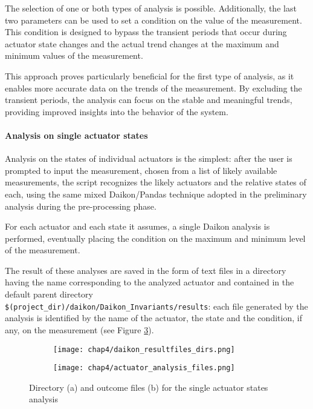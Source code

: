 The selection of one or both types of analysis is possible. Additionally, the last two parameters can be used to set a condition on the value of the measurement. This condition is designed to bypass the transient periods that occur during actuator state changes and the actual trend changes at the maximum and minimum values of the measurement.

This approach proves particularly beneficial for the first type of analysis, as it enables more accurate data on the trends of the measurement. By excluding the transient periods, the analysis can focus on the stable and meaningful trends, providing improved insights into the behavior of the system.

\paragraph{Analysis on single actuator states}
\label{par:4_single_actuator_states_analysis}
Analysis on the states of individual actuators is the simplest: after the user is prompted to input the measurement, chosen from a list of likely available measurements, the script recognizes the likely actuators and the relative states of each, using the same mixed Daikon/Pandas technique adopted in the preliminary analysis during the pre-processing phase.

For each actuator and each state it assumes, a single Daikon analysis is performed, eventually placing the condition on the maximum and minimum level of the measurement.
 
The result of these analyses are saved in the form of text files in a directory having the name corresponding to the analyzed actuator and contained in the default parent directory\\ \texttt{\$(project\_dir)/daikon/Daikon\_Invariants/results}: each file generated by the analysis is identified by the name of the actuator, the state and the condition, if any, on the measurement (see Figure \ref{fig:4_daikon_simpleanalysis_dirfiles}).

\begin{figure}[ht]
	\centering
	\begin{subfigure}{0.48\textwidth}
		\texttt{[image: chap4/daikon\_resultfiles\_dirs.png]}
		\caption{}
		\label{subfig:4_daikon_results_dir}
	\end{subfigure}
	\hfill
	\begin{subfigure}{0.48\textwidth}
		\texttt{[image: chap4/actuator\_analysis\_files.png]}
		\caption{}
		\label{subfig:4_daikon_results_file}
	\end{subfigure}
	\caption{Directory (a) and outcome files (b) for the single actuator states analysis}
	\label{fig:4_daikon_simpleanalysis_dirfiles}
\end{figure}

